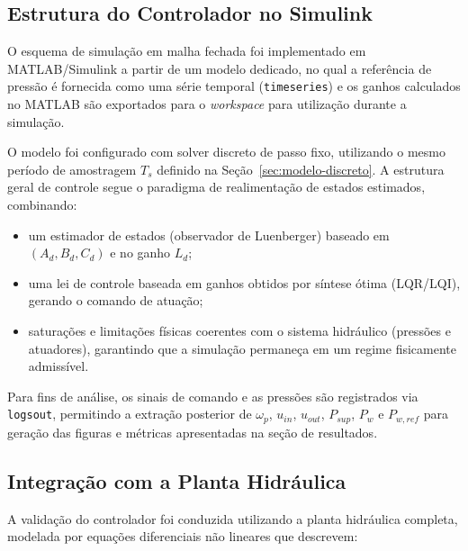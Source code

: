 \subsection{Estrutura do Controlador no Simulink}
\label{sec:estrutura-controlador-simulink}

O esquema de simulação em malha fechada foi implementado em MATLAB/Simulink a partir de um modelo dedicado, no qual a referência de pressão é fornecida como uma série temporal (\texttt{timeseries}) e os ganhos calculados no MATLAB são exportados para o \textit{workspace} para utilização durante a simulação.

O modelo foi configurado com solver discreto de passo fixo, utilizando o mesmo período de amostragem $T_s$ definido na Seção~\ref{sec:modelo-discreto}. A estrutura geral de controle segue o paradigma de realimentação de estados estimados, combinando:
\begin{itemize}
    \item um estimador de estados (observador de Luenberger) baseado em $(A_d,B_d,C_d)$ e no ganho $L_d$;
    \item uma lei de controle baseada em ganhos obtidos por síntese ótima (LQR/LQI), gerando o comando de atuação;
    \item saturações e limitações físicas coerentes com o sistema hidráulico (pressões e atuadores), garantindo que a simulação permaneça em um regime fisicamente admissível.
\end{itemize}

Para fins de análise, os sinais de comando e as pressões são registrados via \texttt{logsout}, permitindo a extração posterior de $\omega_p$, $u_{in}$, $u_{out}$, $P_{sup}$, $P_w$ e $P_{w,ref}$ para geração das figuras e métricas apresentadas na seção de resultados.

\subsection{Integração com a Planta Hidráulica}
\label{sec:integracao-planta-hidraulica}

A validação do controlador foi conduzida utilizando a planta hidráulica completa, modelada por equações diferenciais não lineares que descrevem:

